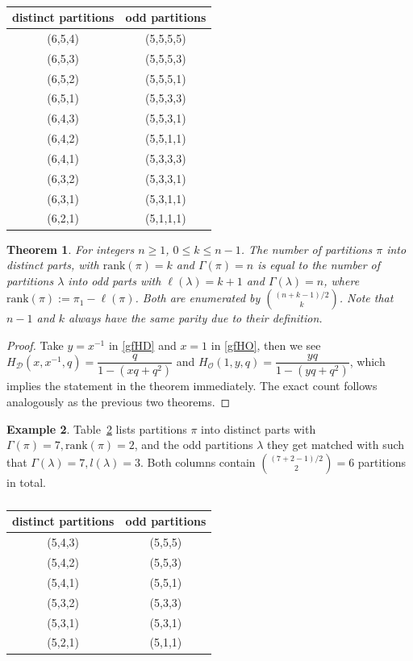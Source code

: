 \documentclass[12pt]{amsart}
\numberwithin{equation}{section}
\theoremstyle{plain}
\newtheorem{theorem}{Theorem}[section]
\theoremstyle{definition}
\newtheorem{example}[theorem]{Example}
\def\D{\mathcal{D}}
\def\O{\mathcal{O}}
\def\rank{\mathrm{rank}}
\begin{document}
\begin{table}[htbp]\caption{}
\centering
\begin{tabular}{|c|c|}
\hline
distinct partitions & odd partitions\\
\hline
(6,5,4) &(5,5,5,5)\\
\hline
(6,5,3) &(5,5,5,3)\\
\hline
(6,5,2) &(5,5,5,1)\\
\hline
(6,5,1) &(5,5,3,3)\\
\hline
(6,4,3) &(5,5,3,1)\\
\hline
(6,4,2) &(5,5,1,1)\\
\hline
(6,4,1) &(5,3,3,3)\\
\hline
(6,3,2) &(5,3,3,1)\\
\hline
(6,3,1) &(5,3,1,1)\\
\hline
(6,2,1) &(5,1,1,1)\\
\hline
\end{tabular}
\label{tab2}
\end{table}

\begin{theorem}
For integers $n\geq 1$, $0\leq k \leq n-1$. The number of partitions $\pi$ into distinct parts, with $\rank(\pi)=k$ and $\Gamma(\pi)=n$ is equal to the number of partitions $\lambda$ into odd parts with $\ell(\lambda)=k+1$ and $\Gamma(\lambda)=n$, where $\rank(\pi):=\pi_1-\ell(\pi)$. Both are enumerated by $\binom{(n+k-1)/2}{k}$. Note that $n-1$ and $k$ always have the same parity due to their definition.
\end{theorem}
\begin{proof}
Take $y=x^{-1}$ in \eqref{gfHD} and $x=1$ in \eqref{gfHO}, then we see $H_{\D}(x,x^{-1},q)=\dfrac{q}{1-(xq+q^2)}$ and $H_{\O}(1,y,q)=\dfrac{yq}{1-(yq+q^2)}$, which implies the statement in the theorem immediately. The exact count follows analogously as the previous two theorems.
\end{proof}
\begin{example}
Table~\ref{tab3} lists partitions $\pi$ into distinct parts with $\Gamma(\pi)=7, \rank(\pi)=2$, and the odd partitions $\lambda$ they get matched with such that $\Gamma(\lambda)=7, l(\lambda)=3$. Both columns contain $\binom{(7+2-1)/2}{2}=6$ partitions in total.
\end{example}


\begin{table}[htbp]\caption{}
\centering
\begin{tabular}{|c|c|}
\hline
distinct partitions & odd partitions\\
\hline
(5,4,3) &(5,5,5)\\
\hline
(5,4,2) &(5,5,3)\\
\hline
(5,4,1) &(5,5,1)\\
\hline
(5,3,2) &(5,3,3)\\
\hline
(5,3,1) &(5,3,1)\\
\hline
(5,2,1) &(5,1,1)\\
\hline
\end{tabular}
\label{tab3}
\end{table}
\end{document}
